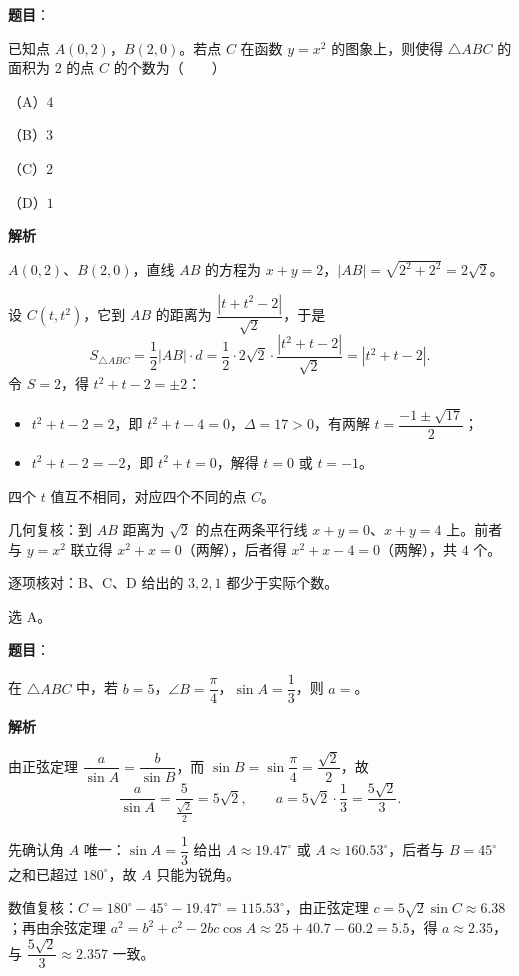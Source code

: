 \begin{answer}

\textbf{题目}：

已知点 $A(0,2)$，$B(2,0)$。若点 $C$ 在函数 $y=x^2$ 的图象上，则使得 $\triangle ABC$ 的面积为 $2$ 的点 $C$ 的个数为\mbox{（　　）}

（A）$4$

（B）$3$

（C）$2$

（D）$1$

\textbf{解析}

$A(0,2)$、$B(2,0)$，直线 $AB$ 的方程为 $x+y=2$，$|AB|=\sqrt{2^2+2^2}=2\sqrt2$。

设 $C(t,t^2)$，它到 $AB$ 的距离为 $\dfrac{|t+t^2-2|}{\sqrt2}$，于是
\nopagebreak[4]
\[
S_{\triangle ABC}=\frac12|AB|\cdot d
=\frac12\cdot2\sqrt2\cdot\frac{|t^2+t-2|}{\sqrt2}
=|t^2+t-2|.
\]
令 $S=2$，得 $t^2+t-2=\pm2$：

\begin{itemize}
\item $t^2+t-2=2$，即 $t^2+t-4=0$，$\Delta=17>0$，有两解 $t=\dfrac{-1\pm\sqrt{17}}{2}$；
\item $t^2+t-2=-2$，即 $t^2+t=0$，解得 $t=0$ 或 $t=-1$。
\end{itemize}

四个 $t$ 值互不相同，对应四个不同的点 $C$。

几何复核：到 $AB$ 距离为 $\sqrt2$ 的点在两条平行线 $x+y=0$、$x+y=4$ 上。前者与 $y=x^2$ 联立得 $x^2+x=0$（两解），后者得 $x^2+x-4=0$（两解），共 $4$ 个。

逐项核对：B、C、D 给出的 $3,2,1$ 都少于实际个数。

选 A。


\end{answer}
\begin{answer}

\textbf{题目}：

在 $\triangle ABC$ 中，若 $b=5$，$\angle B=\dfrac{\pi}{4}$，$\sin A=\dfrac13$，则 $a=$\gkblank{}。

\textbf{解析}

由正弦定理 $\dfrac{a}{\sin A}=\dfrac{b}{\sin B}$，而 $\sin B=\sin\dfrac{\pi}{4}=\dfrac{\sqrt2}{2}$，故
\nopagebreak[4]
\[
\frac{a}{\sin A}=\frac{5}{\frac{\sqrt2}{2}}=5\sqrt2,
\qquad
a=5\sqrt2\cdot\frac13=\frac{5\sqrt2}{3}.
\]

先确认角 $A$ 唯一：$\sin A=\dfrac13$ 给出 $A\approx19.47^\circ$ 或 $A\approx160.53^\circ$，后者与 $B=45^\circ$ 之和已超过 $180^\circ$，故 $A$ 只能为锐角。

数值复核：$C=180^\circ-45^\circ-19.47^\circ=115.53^\circ$，由正弦定理 $c=5\sqrt2\sin C\approx6.38$；再由余弦定理
$a^2=b^2+c^2-2bc\cos A\approx25+40.7-60.2=5.5$，得 $a\approx2.35$，与 $\dfrac{5\sqrt2}{3}\approx2.357$ 一致。


\end{answer}
